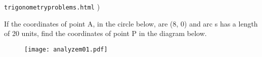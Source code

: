 \begin{enumerate}
{\texttt{trigonometry\textunderscore problems.html}}
)


If the coordinates of point A, in the circle below, are (8, 0) and arc s has a length of 20 units, find the coordinates of point P in the diagram below.

\begin{figure}[H]
\centering
\texttt{[image: analyzem01.pdf]}
\end{figure}


\end{enumerate} %


